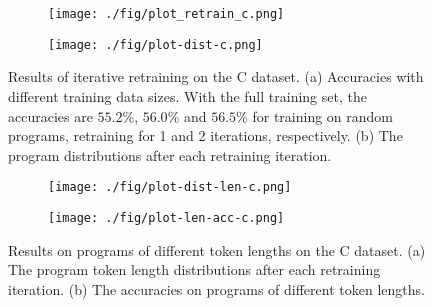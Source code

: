 \begin{figure}[t]
    \centering
    \vspace{-0.1in}
    \begin{subfigure}[t]{0.45\linewidth}
    \texttt{[image: ./fig/plot\_retrain\_c.png]}
    \caption{}
    \label{fig:retrain-c-acc}
    \end{subfigure}
    \begin{subfigure}[t]{0.45\linewidth}
    \texttt{[image: ./fig/plot-dist-c.png]}
    \caption{}
    \label{fig:retrain-c-dist}
    \end{subfigure}
    \vspace{-0.1in}
    \caption{\small Results of iterative retraining on the C dataset. (a) Accuracies with different training data sizes. With the full training set, the accuracies are $55.2\%$, $56.0\%$ and $56.5\%$ for training on random programs, retraining for 1 and 2 iterations, respectively. (b) The program distributions after each retraining iteration.}
    \label{fig:retrain-c}
    \vspace{-0.1in}
\end{figure}

\begin{figure}[t]
    \centering
    \begin{subfigure}[t]{0.45\linewidth}
    \texttt{[image: ./fig/plot-dist-len-c.png]}
    \caption{}
    \label{fig:c-dist-len}
    \end{subfigure}
    \begin{subfigure}[t]{0.45\linewidth}
    \texttt{[image: ./fig/plot-len-acc-c.png]}
    \caption{}
    \label{fig:c-len-acc}
    \end{subfigure}
    \vspace{-0.1in}
    \caption{\small Results on programs of different token lengths on the C dataset. (a) The program token length distributions after each retraining iteration. (b) The accuracies on programs of different token lengths.}
    \vspace{-0.2in}
    \label{fig:res-c-len}
\end{figure}

